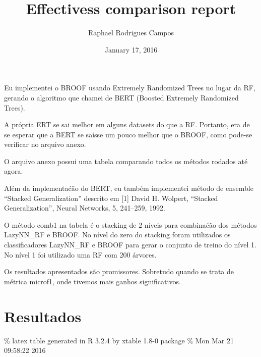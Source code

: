 \documentclass[]{article}
\title{Effectivess comparison report}
\author{Raphael Rodrigues Campos}
\date{January 17, 2016}
\begin{document}
\maketitle


Eu implementei o BROOF usando Extremely Randomized Trees no lugar da RF,
gerando o algoritmo que chamei de BERT (Boosted Extremely Randomized
Trees).

A própria ERT se sai melhor em alguns datasets do que a RF. Portanto,
era de se esperar que a BERT se saísse um pouco melhor que o BROOF, como
pode-se verificar no arquivo anexo.

O arquivo anexo possui uma tabela comparando todos os métodos rodados
até agora.

Além da implementaćão do BERT, eu também implementei método de ensemble
``Stacked Generalization'' descrito em {[}1{]} David H. Wolpert,
``Stacked Generalization'', Neural Networks, 5, 241--259, 1992.

O método comb1 na tabela é o stacking de 2 níveis para combinaćão dos
métodos LazyNN\_RF e BROOF. No nível do zero do stacking foram
utilizados os classificadores LazyNN\_RF e BROOF para gerar o conjunto
de treino do nível 1. No nível 1 foi utilizado uma RF com 200 árvores.

Os resultados apresentados são promissores. Sobretudo quando se trata de
métrica microf1, onde tivemos mais ganhos significativos.

\section{Resultados}\label{resultados}

\% latex table generated in R 3.2.4 by xtable 1.8-0 package \% Mon Mar
21 09:58:22 2016
\end{document}
